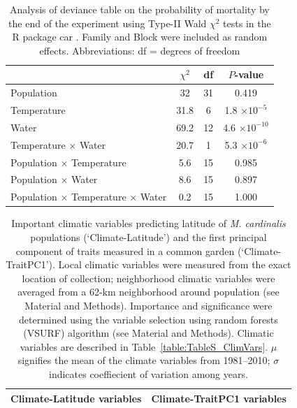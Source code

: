 \documentclass[11pt, oneside]{article}
\newcommand{\pkg}[1]{{\fontseries{b}\selectfont #1}}
\begin{document}
\begin{table}[htbp]
	\fontsize{10}{12}
	\selectfont
	\caption[Analysis of deviance table, mortality]{Analysis of deviance table on the probability of mortality by the end of the experiment using Type-II Wald $\chi ^2$ tests in the R package \pkg{car} \citep{Fox_Weisberg_2011}. Family and Block were included as random effects. Abbreviations: df = degrees of freedom}
	\begin{center}
	\begin{tabular}{lccc}
	\toprule

  & $\chi ^2$ & df & $P$-value \\ \midrule
  Population & 32 & 
    31 & 0.419 \\
  Temperature & 31.8 & 
    6 & 1.8 $\times10^{-5}$ \\
  Water & 69.2 & 
    12 & 4.6 $\times10^{-10}$ \\
  Temperature $\times$ Water & 20.7 & 
    1 & 
    5.3 $\times10^{-6}$ \\
  Population $\times$ Temperature & 5.6 & 
    15 & 
    0.985 \\
  Population $\times$ Water & 8.6 & 
    15 & 
    0.897 \\
  Population $\times$ Temperature $\times$ Water & 
    0.2 & 
    15 & 
    1.000 \\	\bottomrule
	\end{tabular}
	\label{table:TableS_fitMort}
	\end{center}
\end{table}


\begin{table}[ht]
	\fontsize{10}{12}
	\selectfont
  \caption[Important climatic variables]{Important climatic variables predicting latitude of \textit{M. cardinalis} populations (`Climate-Latitude') and the first principal component of traits measured in a common garden (`Climate-TraitPC1'). Local climatic variables were measured from the exact location of collection; neighborhood climatic variables were averaged from a 62-km neighborhood around population (see Material and Methods). Importance and significance were determined using the variable selection using random forests (VSURF) algorithm (see Material and Methods). Climatic variables are described in Table~\ref{table:TableS_ClimVars}. $\mu$ signifies the mean of the climate variables from 1981--2010; $\sigma$ indicates coeffiecient of variation among years. }
   \begin{center}
   \begin{tabular}{@{} ll @{}}
      \toprule
    	Climate-Latitude variables & Climate-TraitPC1 variables \\
      \midrule
			
			\bottomrule
   \end{tabular}
   \end{center}
   \label{table:TableS_ClimVarImp}
\end{table}
\end{document}
